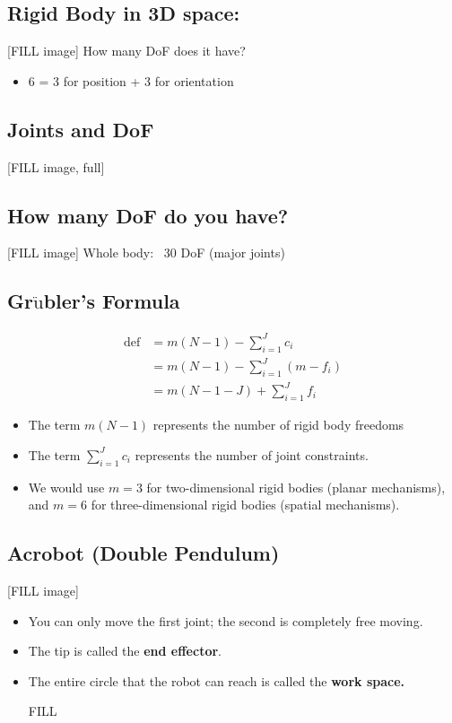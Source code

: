 \documentclass[10pt]{article}
\begin{document}
\subsection*{Rigid Body in 3D space:}
[FILL image]
How many DoF does it have?
\begin{itemize}
    \item 6 = 3 for position + 3 for orientation
\end{itemize}

\subsection*{Joints and DoF}
[FILL image, full]

\subsection*{How many DoF do you have?}
[FILL image]
Whole body: ~30 DoF (major joints)

\subsection*{Gr$\ddot{\text{u}}$bler's Formula}
\begin{align*}
    \text{def} &= m(N - 1) - \sum_{i = 1}^J c_i \\
    &= m(N - 1) - \sum_{i = 1}^J(m - f_i)\\
    &= m(N - 1 - J) + \sum_{i = 1}^J f_i
\end{align*}
\begin{itemize}
    \item The term $m(N - 1)$ represents the number of rigid body freedoms
    \item The term $\sum_{i = 1}^J c_i$ represents the number of joint constraints.
    \item We would use $m = 3$ for two-dimensional rigid bodies (planar mechanisms), and $m = 6$ for three-dimensional rigid bodies (spatial mechanisms).
\end{itemize}

\subsection*{Acrobot (Double Pendulum)}
[FILL image]
\begin{itemize}
    \item You can only move the first joint; the second is completely free moving.
    \item The tip is called the \textbf{end effector}.
    \item The entire circle that the robot can reach is called the \textbf{work space.}
    \item [FILL]
\end{itemize}
\end{document}
